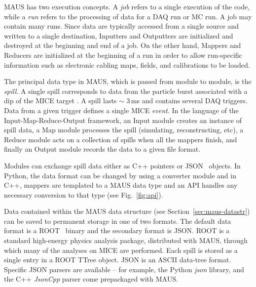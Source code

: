\documentclass{JINST}
\begin{document}
MAUS has two execution concepts. A \emph{job} refers to a single execution of the code, while a \emph{run} refers to the processing of data for a DAQ run or MC run. A job may contain many runs. Since data are typically accessed from a single source and written to a single destination, Inputters and Outputters are initialized and destroyed at the beginning and end of a job. On the other hand, Mappers and Reducers are initialized at the beginning of a run in order to allow run-specific information such as electronic cabling maps, fields, and calibrations to be loaded.

The principal data type in MAUS, which is passed from module to module, is the \emph{spill}. A single spill corresponds to  data from the particle burst associated with a dip of the MICE target \cite{BeamlineJINST}. A spill lasts $\sim$ 3\,ms and contains several DAQ triggers.  Data from a given trigger defines a single MICE \emph{event}. In the language of the Input-Map-Reduce-Output framework, an Input module creates an instance of spill data, a Map module processes the spill (simulating, reconstructing, etc), a Reduce module acts on a collection of spills when all the mappers finish, and finally an Output module records the data to a given file format.

Modules can exchange spill data either as C++ pointers or JSON~\cite{JSON} objects. In Python, the data format can be changed by using a converter module and in C++, mappers are templated to a MAUS data type and an API  handles any necessary conversion to that type (see Fig.~\ref{fig:api}). 


Data contained within the MAUS data structure (see Section~\ref{sec:maus-datastr}) can be saved to permanent storage in one of two formats. The default data format is a ROOT~\cite{ROOT} binary and the secondary format is JSON. ROOT is a standard high-energy physics analysis package, distributed with MAUS, through which many of the analyses on MICE are performed. Each spill is stored as a single entry in a ROOT TTree object.  JSON is an ASCII data-tree format. Specific JSON parsers are available -- for example, the Python \emph{json} library, and the C++ \emph{JsonCpp} \cite{JSONCPP} parser come prepackaged with MAUS. 
\end{document}
